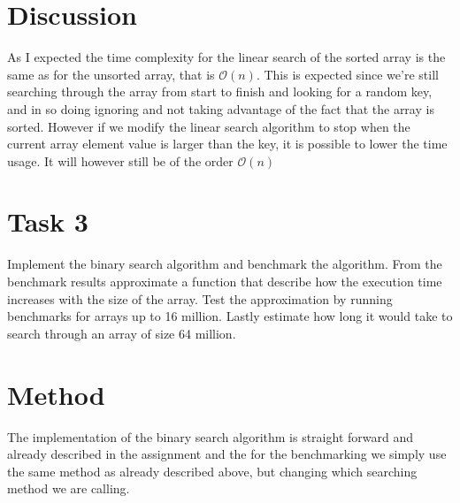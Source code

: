 \documentclass[a4paper,11pt]{article}
\begin{document}
\section*{Discussion}

As I expected the time complexity for the linear search of the sorted array is the same
as for the unsorted array, that is $\mathcal{O}(n)$. This is expected since we're still
searching through the array from start to finish and looking for a random key, and in so
doing ignoring and not taking advantage of the fact that the array is sorted. However if
we modify the linear search algorithm to stop when the current array element value is
larger than the key, it is possible to lower the time usage. It will however still be of
the order $\mathcal{O}(n)$

\section*{Task 3}

Implement the binary search algorithm and benchmark the algorithm. From the benchmark results
approximate a function that describe how the execution time increases with the size of
the array. Test the approximation by running benchmarks for arrays up to 16 million.
Lastly estimate how long it would take to search through an array of size 64 million.
\section*{Method}

The implementation of the binary search algorithm is straight forward and already described
in the assignment and the for the benchmarking we simply use the same method as already described
above, but changing which searching method we are calling.
\end{document}

